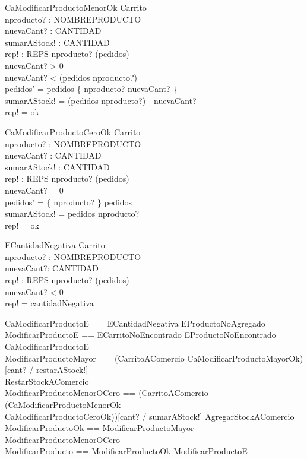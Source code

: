 \documentclass[11pt]{article}
\begin{document}
\begin{schema}{CaModificarProductoMenorOk}
\Delta Carrito \\
nproducto? : NOMBREPRODUCTO \\
nuevaCant? : CANTIDAD \\
sumarAStock! : CANTIDAD \\
rep! : REPS
\where
nproducto? \in (\dom pedidos) \\
nuevaCant? > 0 \\
nuevaCant? < (pedidos \; nproducto?) \\
pedidos' = pedidos \oplus \{ nproducto? \mapsto nuevaCant? \} \\
sumarAStock! = (pedidos \; nproducto?) - nuevaCant? \\
rep! = ok
\end{schema}

\begin{schema}{CaModificarProductoCeroOk}
\Delta Carrito \\
nproducto? : NOMBREPRODUCTO \\
nuevaCant? : CANTIDAD \\
sumarAStock! : CANTIDAD \\
rep! : REPS
\where
nproducto? \in (\dom pedidos) \\
nuevaCant? = 0 \\
pedidos' = \{ nproducto? \} \ndres pedidos \\
sumarAStock! = pedidos \; nproducto?\\
rep! = ok
\end{schema}

\begin{schema}{ECantidadNegativa}
\Xi Carrito \\
nproducto? : NOMBREPRODUCTO \\
nuevaCant?: CANTIDAD \\
rep! : REPS
\where
nproducto? \in (\dom pedidos) \\
nuevaCant? < 0 \\
rep! = cantidadNegativa
\end{schema}


\begin{zed}
CaModificarProductoE == ECantidadNegativa \lor EProductoNoAgregado \\
ModificarProductoE == ECarritoNoEncontrado \lor EProductoNoEncontrado \lor CaModificarProductoE  \\
ModificarProductoMayor == (CarritoAComercio \land CaModificarProductoMayorOk)[cant? / restarAStock!] \semi \\
\; RestarStockAComercio \\
ModificarProductoMenorOCero == (CarritoAComercio \land (CaModificarProductoMenorOk \lor \\
\; CaModificarProductoCeroOk))[cant? / sumarAStock!] \semi AgregarStockAComercio \\
ModificarProductoOk == ModificarProductoMayor \lor ModificarProductoMenorOCero \\
ModificarProducto == ModificarProductoOk \lor ModificarProductoE
\end{zed}
\end{document}
